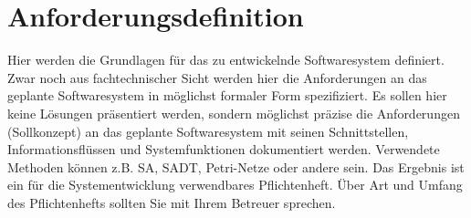 \chapter{Anforderungsdefinition}\label{chp:anforderungsdefinition}
Hier werden die Grundlagen für das zu entwickelnde Softwaresystem definiert. Zwar noch aus fachtechnischer Sicht werden hier die Anforderungen an das geplante Softwaresystem in möglichst formaler Form spezifiziert. Es sollen hier keine Lösungen präsentiert werden, sondern möglichst präzise die Anforderungen (Sollkonzept) an das geplante Softwaresystem mit seinen Schnittstellen, Informationsflüssen und Systemfunktionen dokumentiert werden. Verwendete Methoden können z.B. SA, SADT, Petri-Netze oder andere sein.
Das Ergebnis ist ein für die Systementwicklung verwendbares Pflichtenheft. Über Art und Umfang des Pflichtenhefts sollten Sie mit Ihrem Betreuer sprechen.